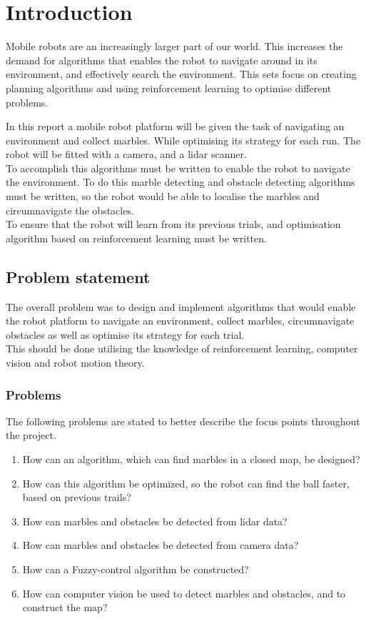 \documentclass[../Head/Main.tex]{subfiles}
\begin{document}
\section{Introduction}
Mobile robots are an increasingly larger part of our world. This increases the demand for algorithms that enables the robot to navigate around in its environment, and effectively search the environment. This sets focus on creating planning algorithms and using reinforcement learning to optimise different problems.\par 
In this report a mobile robot platform will be given the task of navigating an environment and collect marbles. While optimising its strategy for each run. The robot will be fitted with a camera, and a lidar scanner.\\
To accomplish this algorithms must be written to enable the robot to navigate the environment. To do this marble detecting and obstacle detecting algorithms must be written, so the robot would be able to localise the marbles and circumnavigate the obstacles.\\
To ensure that the robot will learn from its previous trials, and optimisation algorithm based on reinforcement learning must be written.    

\subsection{Problem statement}
The overall problem was to design and implement algorithms that would enable the robot platform to navigate an environment, collect marbles, circumnavigate obstacles as well as optimise its strategy for each trial.\\
This should be done utilising the knowledge of reinforcement learning, computer vision and robot motion theory.

\subsubsection{Problems} 
The following problems are stated to better describe the focus points throughout the project.
\begin{enumerate}
        \item How can an algorithm, which can find marbles in a closed map, be designed?
        \item How can this algorithm be optimized, so the robot can find the ball faster, based on previous trails? 
        \item How can marbles and obstacles be detected from lidar data?
        \item How can marbles and obstacles be detected from camera data?
        \item How can a Fuzzy-control algorithm be constructed?
        \item How can computer vision be used to detect marbles and obstacles, and to construct the map? 
\end{enumerate}
\end{document}
